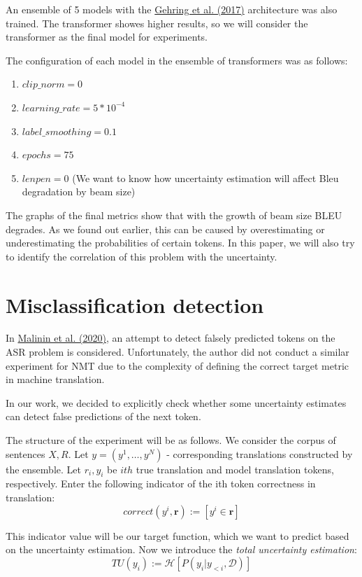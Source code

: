 \documentclass[a4paper,14pt]{extarticle}
\newcommand{\bibref}[3]{\hyperlink{#1}{#2 (#3)}}
\begin{document}
	An ensemble of 5 models with the \bibref{fconv}{Gehring et al.}{2017} architecture was also trained. The transformer showes higher results, so we will consider the transformer as the final model for experiments.
	
	The configuration of each model in the ensemble of transformers was as follows:
	\begin{enumerate}
		\item $clip\_norm = 0$
		\item $learning\_rate=5*10^{-4}$
		\item $label\_smoothing=0.1$
		\item $epochs=75$
		\item $lenpen=0$ (We want to know how uncertainty estimation will affect Bleu degradation by beam size)
	\end{enumerate}
	
	The graphs of the final metrics show that with the growth of beam size BLEU degrades. As we found out earlier, this can be caused by overestimating or underestimating the probabilities of certain tokens. In this paper, we will also try to identify the correlation of this problem with the uncertainty.
	
\section{Misclassification detection}
	In \bibref{uncertainty}{Malinin et al.} {2020}, an attempt to detect falsely predicted tokens on the ASR problem is considered. Unfortunately, the author did not conduct a similar experiment for NMT due to the complexity of defining the correct target metric in machine translation.

	In our work, we decided to explicitly check whether some uncertainty estimates can detect false predictions of the next token.

	The structure of the experiment will be as follows. We consider the corpus of sentences $X, R$. Let $y = (y^1, \dots, y^N)$ - corresponding translations constructed by the ensemble. Let $r_{i}, y_{i}$ be $ith$  true translation and model translation tokens, respectively. Enter the following indicator of the ith token correctness in translation:
	\begin{equation}
		correct(y^{i}, \textbf{r}) := [y^{i} \in \textbf{r}]
	\end{equation}
	
	This indicator value will be our target function, which we want to predict based on the uncertainty estimation. Now we introduce the \textit{total uncertainty estimation}:
	\begin{equation}
		TU(y_i) := \mathcal{H}[P(y_i|y_{<i}, \mathcal{D})]
	\end{equation}
	
\end{document}
